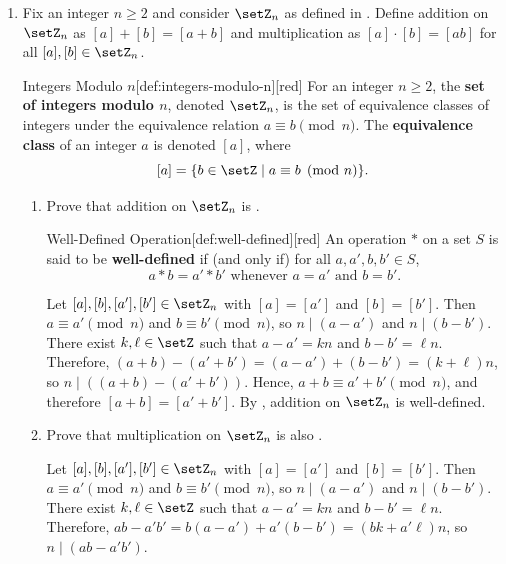 \begin{enumerate}
  \newpage
  \item Fix an integer \(n \geq 2\) and consider \(\setZ_{n}\) as 
  defined in .
  Define addition on \(\setZ_{n}\) as \([a] + [b] = [a + b]\) and 
  multiplication as \([a] \cdot [b] = [a b]\) for all \([a], [b] \in \setZ_{n}\).
  \begin{define}{Integers Modulo \(n\)}[def:integers-modulo-n][red]
    For an integer \(n \geq 2\), the \textbf{set of integers modulo \(n\)}, 
    denoted \(\setZ_{n}\), is the set of equivalence classes of integers 
    under the equivalence relation \(a \equiv b \pmod{n}\). 
    The \textbf{equivalence class} of an integer \(a\) is denoted \([a]\), 
    where
    \[
      [a] = \{b \in \setZ \mid a \equiv b \pmod{n}\}.
    \]
  \end{define}
  \begin{enumerate}
    \item Prove that addition on \(\setZ_{n}\) is .
    \begin{define}{Well-Defined Operation}[def:well-defined][red]
      An operation \(*\) on a set \(S\) is said to be \textbf{well-defined} 
      if (and only if) for all \(a, a', b, b' \in S\), 
      \[
        a * b = a' * b' \text{ whenever } a = a' \text{ and } b = b'.
      \]
    \end{define}
    \begin{subprove}
      Let \([a], [b], [a'], [b'] \in \setZ_{n}\) with \([a] = [a']\) and \([b] = [b']\).
      Then \(a \equiv a' \pmod{n}\) and \(b \equiv b' \pmod{n}\), so \(n \mid (a - a')\) and \(n \mid (b - b')\).
      There exist \(k, \ell \in \setZ\) such that \(a - a' = k n\) and \(b - b' = \ell n\).
      Therefore, \((a + b) - (a' + b') = (a - a') + (b - b') = (k + \ell) n\), so \(n \mid ((a + b) - (a' + b'))\).
      Hence, \(a + b \equiv a' + b' \pmod{n}\), and therefore \([a + b] = [a' + b']\).
      By , addition on \(\setZ_{n}\) is well-defined.
    \end{subprove}
    \item Prove that multiplication on \(\setZ_{n}\) is also .
    \begin{subprove}
      Let \([a], [b], [a'], [b'] \in \setZ_{n}\) with \([a] = [a']\) and \([b] = [b']\).
      Then \(a \equiv a' \pmod{n}\) and \(b \equiv b' \pmod{n}\), so \(n \mid (a - a')\) and \(n \mid (b - b')\).
      There exist \(k, \ell \in \setZ\) such that \(a - a' = k n\) and \(b - b' = \ell n\).
      Therefore, \(a b - a' b' = b (a - a') + a' (b - b') = (b k + a' \ell) n\), so \(n \mid (a b - a' b')\).

\end{subprove}
\end{enumerate}
\end{enumerate}
